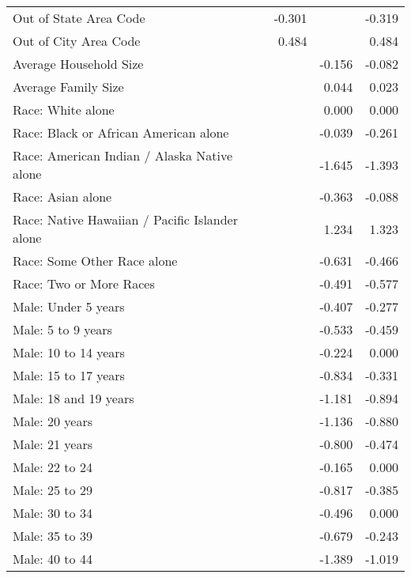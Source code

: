 \begin{center}
\begin{small}
\begin{longtable}{l D{.}{.}{2.3} D{.}{.}{2.3} D{.}{.}{2.3} }
Out of State Area Code                         & -0.301 &        & -0.319 \\
Out of City Area Code                          & 0.484  &        & 0.484  \\
Average Household Size                         &        & -0.156 & -0.082 \\
Average Family Size                            &        & 0.044  & 0.023  \\
Race: White alone                              &        & 0.000  & 0.000  \\
Race: Black or African American alone          &        & -0.039 & -0.261 \\
Race: American Indian / Alaska Native alone    &        & -1.645 & -1.393 \\
Race: Asian alone                              &        & -0.363 & -0.088 \\
Race: Native Hawaiian / Pacific Islander alone &        & 1.234  & 1.323  \\
Race: Some Other Race alone                    &        & -0.631 & -0.466 \\
Race: Two or More Races                        &        & -0.491 & -0.577 \\
Male: Under 5 years                            &        & -0.407 & -0.277 \\
Male: 5 to 9 years                             &        & -0.533 & -0.459 \\
Male: 10 to 14 years                           &        & -0.224 & 0.000  \\
Male: 15 to 17 years                           &        & -0.834 & -0.331 \\
Male: 18 and 19 years                          &        & -1.181 & -0.894 \\
Male: 20 years                                 &        & -1.136 & -0.880 \\
Male: 21 years                                 &        & -0.800 & -0.474 \\
Male: 22 to 24                                 &        & -0.165 & 0.000  \\
Male: 25 to 29                                 &        & -0.817 & -0.385 \\
Male: 30 to 34                                 &        & -0.496 & 0.000  \\
Male: 35 to 39                                 &        & -0.679 & -0.243 \\
Male: 40 to 44                                 &        & -1.389 & -1.019 \\

\end{longtable}
\end{small}
\end{center}
